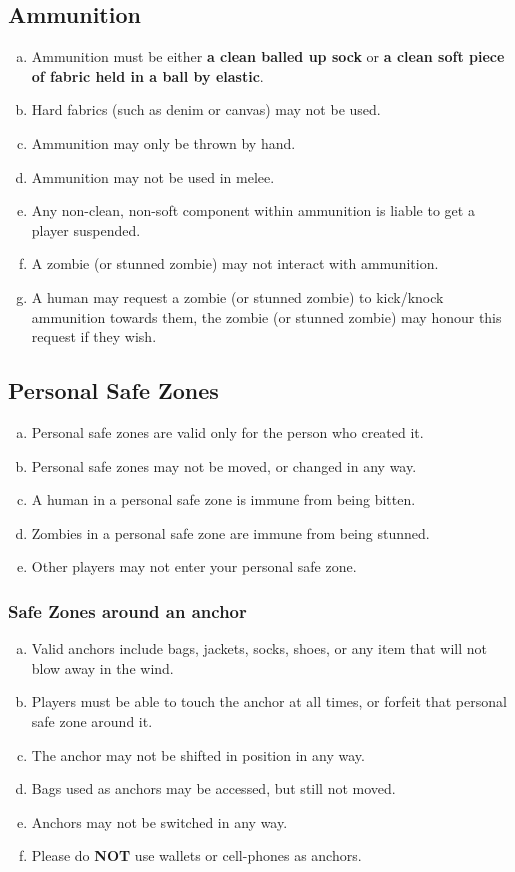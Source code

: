 \documentclass[a4paper,12pt]{article}
\begin{document}
\subsection{Ammunition}
\begin{enumerate}[(a)]
    \item Ammunition must be either {\bf a clean balled up sock} or {\bf a clean soft piece of fabric held in a ball by elastic}.
    \item Hard fabrics (such as denim or canvas) may not be used.
    \item Ammunition may only be thrown by hand.
    \item Ammunition may not be used in melee.
    \item Any non-clean, non-soft component within ammunition is liable to get a player suspended. 
    \item A zombie (or stunned zombie) may not interact with ammunition.
    \item A human may request a zombie (or stunned zombie) to kick/knock ammunition towards them, the zombie (or stunned zombie) may honour this request if they wish.
\end{enumerate}

\subsection{Personal Safe Zones}
\begin{enumerate}[(a)]
    \item Personal safe zones are valid only for the person who created it.
    \item Personal safe zones may not be moved, or changed in any way.
    \item A human in a personal safe zone is immune from being bitten.
    \item Zombies in a personal safe zone are immune from being stunned.
    \item Other players may not enter your personal safe zone.
\end{enumerate} 

\subsubsection{Safe Zones around an anchor}

\begin{enumerate}[(a)]
    \item Valid anchors include bags, jackets, socks, shoes, or any item that will not blow away in the wind.
    \item Players must be able to touch the anchor at all times, or forfeit that personal safe zone around it.
    \item The anchor may not be shifted in position in any way.
    \item Bags used as anchors may be accessed, but still not moved.
    \item Anchors may not be switched in any way.
    \item Please do {\bf NOT} use wallets or cell-phones as anchors.
\end{enumerate}
\end{document}
